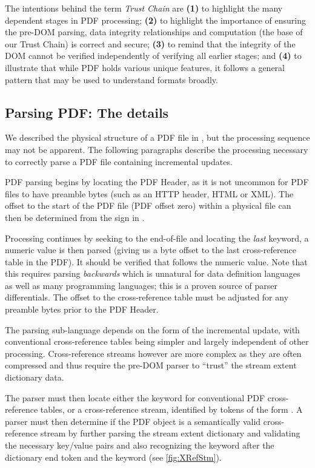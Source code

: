 
The intentions behind the term \emph{Trust Chain} are
%
\textbf{(1)} to highlight the many dependent stages in PDF processing;
%
\textbf{(2)} to highlight the importance of ensuring the pre-DOM
parsing, data integrity relationships and computation (the base of our
Trust Chain) is correct and secure;
%
\textbf{(3)} to remind that the integrity of the DOM cannot be
verified independently of verifying all earlier stages; and
%
\textbf{(4)} to illustrate that while PDF holds various unique
features, it follows a general pattern that may be used to understand
formats broadly.


\subsection{Parsing PDF: The details}
\label{sec:parsingfile}

We described the physical structure of a PDF file in ,
but the processing sequence may not be apparent.
The following paragraphs describe the processing necessary to correctly parse a PDF file containing incremental updates.

PDF parsing begins by locating the PDF Header, as it is not uncommon for PDF files to have 
preamble bytes (such as an HTTP header, HTML or XML). The offset to the start of the PDF file 
(PDF offset zero)
within a physical file can then be determined from the \lstcd{\%} sign in . 

Processing continues by seeking to the end-of-file and 
locating the \emph{last}  keyword,
a numeric value is then parsed (giving us a byte offset 
to the last cross-reference table in the PDF).
It should be verified that  follows the numeric value.
%
Note that this requires parsing \emph{backwards}
which is unnatural for data definition languages as well as many programming
languages;
this is a proven source of parser differentials. 
The offset to the cross-reference table must be adjusted 
for any preamble bytes prior to the PDF Header.

The parsing sub-language depends on the form of the incremental update, with
conventional cross-reference tables being simpler and largely independent of
other processing. Cross-reference streams however are more complex as they are
often compressed and thus require the pre-DOM parser to ``trust'' the stream
extent dictionary data.

The parser must then locate either the  keyword for
conventional PDF cross-reference tables, or a cross-reference stream, identified by tokens of the form  . 
A parser must then determine if the PDF object is a
semantically valid cross-reference stream by further parsing the stream extent dictionary and 
validating the necessary key/value pairs and also recognizing the  keyword after the dictionary end token \lstcd{>>} and the  keyword (see \cref{fig:XRefStm}). 

